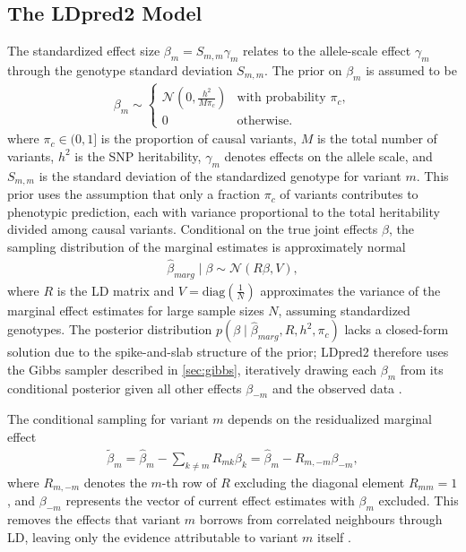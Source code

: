 \subsection{The LDpred2 Model}
The standardized effect size $\beta_m = S_{m,m}\gamma_m$ relates to
the allele-scale effect $\gamma_m$ through the genotype standard
deviation $S_{m,m}$. The prior on $\beta_m$ is assumed to be
\begin{align*}
\beta_m \sim \begin{cases}
\mathcal{N}\left(0, \frac{h^2}{M\pi_c}\right) & \text{with probability } \pi_c, \\
0 & \text{otherwise}.
\end{cases}
\end{align*}
where $\pi_c \in (0,1]$ is the proportion of causal variants, $M$ is the total number of variants, $h^2$ is the SNP heritability, $\gamma_m$ denotes effects on the allele scale, and $S_{m,m}$ is the standard deviation of the standardized genotype for variant $m$. This prior uses the assumption that only a fraction $\pi_c$ of variants contributes to phenotypic prediction, each with variance proportional to the total heritability divided among causal variants. Conditional on the true joint effects $\beta$, the sampling distribution of the marginal estimates is approximately normal
\begin{align*}
\hat{\beta}_{marg} \mid \beta \sim \mathcal{N}(R\beta, V),
\end{align*}
where $R$ is the LD matrix and $V = \text{diag}\left(\frac{1}{N}\right)$ approximates the variance of the marginal effect estimates for large sample sizes $N$, assuming standardized genotypes. The posterior distribution $p(\beta \mid \hat{\beta}_{marg}, R, h^2, \pi_c)$ lacks a closed-form solution due to the spike-and-slab structure of the prior; LDpred2 therefore uses the Gibbs sampler described in \autoref{sec:gibbs}, iteratively drawing each $\beta_m$ from its conditional posterior given all other effects $\beta_{-m}$ and the observed data \citep{Prive2020}.

The conditional sampling for variant $m$ depends on the residualized marginal effect
\begin{align*}
\tilde{\beta}_m = \hat{\beta}_m - \sum_{k \neq m} R_{mk}\beta_k = \hat{\beta}_m - R_{m,-m}\beta_{-m},
\end{align*}
where $R_{m,-m}$ denotes the $m$-th row of $R$ excluding the diagonal element $R_{mm} = 1$, and $\beta_{-m}$ represents the vector of current effect estimates with $\beta_m$ excluded. This removes the effects that variant $m$ borrows from correlated neighbours through LD, leaving only the evidence attributable to variant $m$ itself \citep{Prive2020}.

